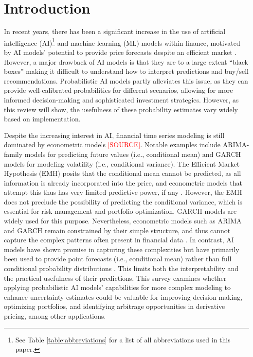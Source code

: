 \section{Introduction}
\label{sec:introduction}
In recent years, there has been a significant increase in the use of artificial intelligence (AI)\footnote{
See Table \ref{table:abbreviations} for a list of all abbreviations used in this paper.
} and machine learning (ML) models within finance, motivated by AI models' potential to provide price forecasts despite an efficient market \parencite{sezer2020financial}. However, a major drawback of AI models is that they are to a large extent ``black boxes'' making it difficult to understand how to interpret predictions and buy/sell recommendations. Probabilistic AI models partly alleviates this issue, as they can provide well-calibrated probabilities for different scenarios, allowing for more informed decision-making and sophisticated investment strategies. However, as this review will show, the usefulness of these probability estimates vary widely based on implementation.

Despite the increasing interest in AI, financial time series modeling is still dominated by econometric models \textcolor{red}{[SOURCE]}. Notable examples include ARIMA-family models for predicting future values (i.e., conditional mean) and GARCH models for modeling volatility (i.e., conditional variance). The Efficient Market Hypothesis (EMH) posits that the conditional mean cannot be predicted, as all information is already incorporated into the price, and econometric models that attempt this thus has very limited predictive power, if any \parencite{Campbell2007}. However, the EMH does not preclude the possibility of predicting the conditional variance, which is essential for risk management and portfolio optimization. GARCH models are widely used for this purpose. Nevertheless, econometric models such as ARIMA and GARCH remain constrained by their simple structure, and thus cannot capture the complex patterns often present in financial data \parencite{sezer2020financial}. In contrast, AI models have shown promise in capturing these complexities but have primarily been used to provide point forecasts (i.e., conditional mean) rather than full conditional probability distributions \parencite{Tang2022Survey}. This limits both the interpretability and the practical usefulness of their predictions. This survey examines whether applying probabilistic AI models' capabilities for more complex modeling to enhance uncertainty estimates could be valuable for improving decision-making, optimizing portfolios, and identifying arbitrage opportunities in derivative pricing, among other applications.


